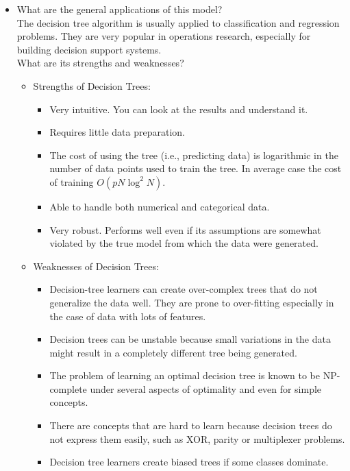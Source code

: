 \documentclass[twoside,openright,titlepage,numbers=noenddot,headinclude,%
               footinclude=true,cleardoublepage=empty,abstractoff,BCOR=5mm,%
               paper=a4,fontsize=11pt,ngerman,american]{scrreprt}
\numberwithin{theorem}{chapter}
\numberwithin{definition}{chapter}
\numberwithin{algorithm}{chapter}
\numberwithin{figure}{chapter}
\numberwithin{table}{chapter}
\numberwithin{equation}{chapter}
\begin{document}
\begin{itemize}
\item What are the general applications of this model?\\
The decision tree algorithm is usually applied to classification and regression problems. They are very popular in operations research, especially for building decision support systems. \\
What are its strengths and weaknesses?\\  
       \begin{itemize}
       \item Strengths of Decision Trees:
              \begin{itemize} 
                     \item Very intuitive. You can look at the results and understand it. 
                     \item Requires little data preparation. 
                     \item The cost of using the tree (i.e., predicting data) is logarithmic in the number of data points used to train the tree. In average case the cost of training $ O(pN\log^2 N)$.
                     \item Able to handle both numerical and categorical data.
                     \item Very robust. Performs well even if its assumptions are somewhat violated by the true model from which the data were generated.
              \end{itemize}
       \item Weaknesses of Decision Trees:
              \begin{itemize} 
                     \item Decision-tree learners can create over-complex trees that do not generalize the data well. They are prone to over-fitting especially in the case of data with lots of features.
                     \item Decision trees can be unstable because small variations in the data might result in a completely different tree being generated. 
                     \item The problem of learning an optimal decision tree is known to be NP-complete under several aspects of optimality and even for simple concepts. 
                     \item There are concepts that are hard to learn because decision trees do not express them easily, such as XOR, parity or multiplexer problems.
                     \item Decision tree learners create biased trees if some classes dominate. 
              \end{itemize}
       \end{itemize}



\end{itemize}
\end{document}

